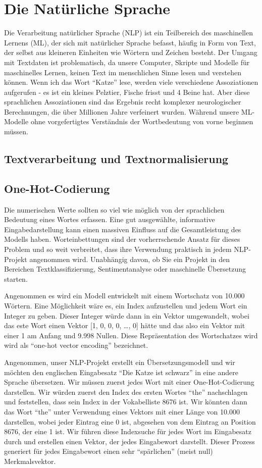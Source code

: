 \chapter{Die Natürliche Sprache}
Die Verarbeitung natürlicher Sprache (NLP) ist ein Teilbereich des maschinellen Lernens (ML), der sich mit natürlicher Sprache befasst, häufig in Form von Text, der selbst aus kleineren Einheiten wie Wörtern und Zeichen besteht. Der Umgang mit Textdaten ist problematisch, da unsere Computer, Skripte und Modelle für maschinelles Lernen, keinen Text im menschlichen Sinne lesen und verstehen können.
Wenn ich das Wort \enquote{Katze} lese, werden viele verschiedene Assoziationen aufgerufen - es ist ein kleines Pelztier, Fische frisst und 4 Beine hat. Aber diese sprachlichen Assoziationen sind das Ergebnis recht komplexer neurologischer Berechnungen, die über Millionen Jahre verfeinert wurden. Während unsere ML-Modelle ohne vorgefertigtes Verständnis der Wortbedeutung von vorne beginnen müssen.

\section{Textverarbeitung und Textnormalisierung}


\section{One-Hot-Codierung}
Die numerischen Werte sollten so viel wie möglich von der sprachlichen Bedeutung eines Wortes erfassen. Eine gut ausgewählte, informative Eingabedarstellung kann einen massiven Einfluss auf die Gesamtleistung des Modells haben. Worteinbettungen sind der vorherrschende Ansatz für dieses Problem und so weit verbreitet, dass ihre Verwendung praktisch in jedem NLP-Projekt angenommen wird. Unabhängig davon, ob Sie ein Projekt in den Bereichen Textklassifizierung, Sentimentanalyse oder maschinelle Übersetzung starten.

Angenommen es wird ein Modell entwickelt mit einem Wortschatz von 10.000 Wörtern. Eine Möglichkeit wäre es, ein Index aufzustellen und jedem Wort ein Integer zu geben. Dieser Integer würde dann in ein Vektor umgewandelt, wobei das este Wort einen Vektor [1, 0, 0, 0, …, 0] hätte und das also ein Vektor mit einer 1 am Anfang und  9.998 Nullen. Diese Repräsentation des Wortschatzes wird  wird als \enquote{one-hot vector encoding} bezeichnet.

Angenommen, unser NLP-Projekt erstellt ein Übersetzungsmodell und wir möchten den englischen Eingabesatz \enquote{Die Katze ist schwarz} in eine andere Sprache übersetzen. Wir müssen zuerst jedes Wort mit einer One-Hot-Codierung darstellen. Wir würden zuerst den Index des ersten Wortes \enquote{the} nachschlagen und feststellen, dass sein Index in der Vokabelliste 8676 ist. Wir könnten dann das Wort \enquote{the} unter Verwendung eines Vektors mit einer Länge von 10.000 darstellen, wobei jeder Eintrag eine 0 ist, abgesehen von dem Eintrag an Position 8676, der eine 1 ist. Wir führen diese Indexsuche für jedes Wort im Eingabesatz durch und erstellen einen Vektor, der jedes Eingabewort darstellt. Dieser Prozess generiert für jedes Eingabewort einen sehr \enquote{spärlichen} (meist null) Merkmalsvektor.

